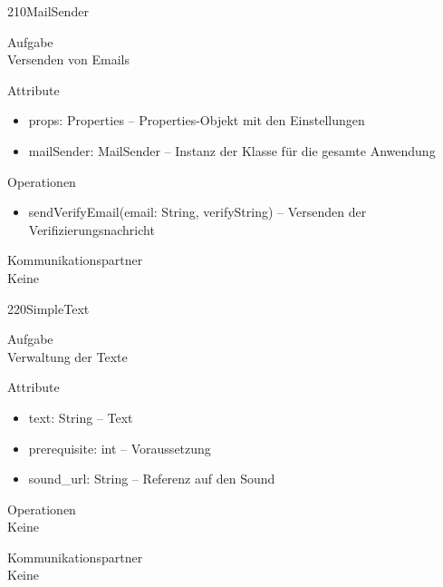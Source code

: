 \newpage
\begin{class}{210}{MailSender}
\item[Aufgabe]~\\
Versenden von Emails
\item[Attribute]~\\
\begin{itemize}
\item props: Properties -- Properties-Objekt mit den Einstellungen
\item mailSender: MailSender -- Instanz der Klasse für die gesamte Anwendung
\end{itemize}
\item[Operationen]~\\
\begin{itemize}
\item sendVerifyEmail(email: String, verifyString) -- Versenden der Verifizierungsnachricht
\end{itemize}
\item[Kommunikationspartner]~\\
Keine
\end{class}

\newpage
\begin{class}{220}{SimpleText}
\item[Aufgabe]~\\
Verwaltung der Texte
\item[Attribute]~\\
\begin{itemize}
\item text: String -- Text
\item prerequisite: int -- Voraussetzung
\item sound\_url: String -- Referenz auf den Sound
\end{itemize}
\item[Operationen]~\\
Keine
\item[Kommunikationspartner]~\\
Keine
\end{class}

